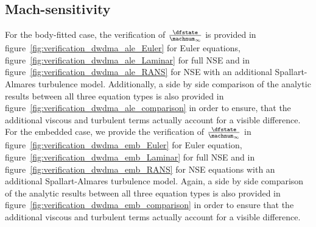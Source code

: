 \documentclass[../main.tex]{subfiles}
\begin{document}
\subsection{Mach-sensitivity}\label{sec:verification_dwds_mach}
For the body-fitted case, the verification of $\tfrac{\dfstate}{\machnum_{\infty}}$ is provided in figure~\ref{fig:verification_dwdma_ale_Euler} for Euler equations, figure~\ref{fig:verification_dwdma_ale_Laminar} for full \ac{NSE} and in figure~\ref{fig:verification_dwdma_ale_RANS} for \ac{NSE} with an additional Spallart-Almares turbulence model.
Additionally, a side by side comparison of the analytic results between all three equation types is also provided in figure~\ref{fig:verification_dwdma_ale_comparison} in order to ensure, that the additional viscous and turbulent terms actually account for a visible difference.\\
For the embedded case, we provide the verification of $\tfrac{\dfstate}{\machnum_{\infty}}$  in figure~\ref{fig:verification_dwdma_emb_Euler} for Euler equation, figure~\ref{fig:verification_dwdma_emb_Laminar} for full \ac{NSE} and in figure~\ref{fig:verification_dwdma_emb_RANS} for \ac{NSE} equations with an additional Spallart-Almares turbulence model.
Again, a side by side comparison of the analytic results between all three equation types is also provided in figure~\ref{fig:verification_dwdma_emb_comparison} in order to ensure that the additional viscous and turbulent terms actually account for a visible difference.
\end{document}
